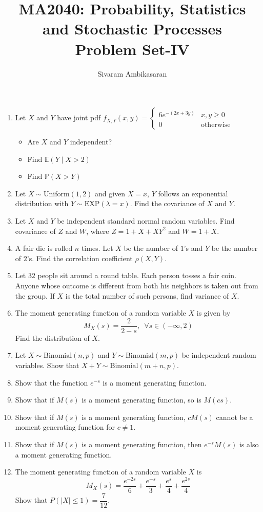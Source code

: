 \documentclass{article}
\title{MA2040: Probability, Statistics and Stochastic Processes\\
Problem Set-IV}
\author{Sivaram Ambikasaran}
\newcommand{\abs}[1]{\displaystyle\left\lvert#1\right\rvert}
\newcommand{\Pb}{\mathbb{P}}
\newcommand{\bkt}[1]{\left(#1\right)}
\begin{document}
	\maketitle
	\begin{enumerate}
		\item
		Let $X$ and $Y$ have joint pdf $f_{X,Y}(x,y) = \begin{cases}
		6 e^{-\bkt{2x+3y}} & x,y \geq 0\\
		0 & \text{otherwise}
		\end{cases}$
	\begin{itemize}
		\item
		Are $X$ and $Y$ independent?
		\item
		Find $\mathbb{E}\bkt{Y \mid X>2}$
		\item
		Find $\Pb\bkt{X > Y}$
	\end{itemize}
	\item
	Let $X \sim \text{Uniform}(1,2)$ and given $X=x$, $Y$ follows an exponential distribution with $Y \sim \text{EXP}\bkt{\lambda=x}$. Find the covariance of $X$ and $Y$.
	\item
	Let $X$ and $Y$ be independent standard normal random variables. Find covariance of $Z$ and $W$, where $Z = 1+X+XY^2$ and $W = 1+X$.
	\item
	A fair die is rolled $n$ times. Let $X$ be the number of $1$'s and $Y$ be the number of $2$'s. Find the correlation coefficient $\rho(X,Y)$.
	\item
	Let $32$ people sit around a round table. Each person tosses a fair coin. Anyone whose outcome is different from both his neighbors is taken out from the group. If $X$ is the total number of such persons, find variance of $X$.
	\item
	The moment generating function of a random variable $X$ is given by
	$$M_X(s) = \dfrac2{2-s}, \,\,\, \forall s \in (-\infty,2)$$
	Find the distribution of $X$.
	\item
	Let $X \sim \text{Binomial}(n,p)$ and $Y \sim \text{Binomial}(m,p)$ be independent random variables. Show that $X+Y \sim \text{Binomial}(m+n,p)$.
	\item
	Show that the function $e^{-s}$ is a moment generating function.
	\item
	Show that if $M(s)$ is a moment generating function, so is $M(cs)$.
	\item
	Show that if $M(s)$ is a moment generating function, $cM(s)$ cannot be a moment generating function for $c \neq 1$.
	\item
	Show that if $M(s)$ is a moment generating function, then $e^{-s}M(s)$ is also a moment generating function.
	\item
	The moment generating function of a random variable $X$ is
	$$M_X(s) = \dfrac{e^{-2s}}6 + \dfrac{e^{-s}}3 + \dfrac{e^{s}}4 + \dfrac{e^{2s}}4$$
	Show that $P\bkt{\abs{X} \leq 1} = \dfrac7{12}$.
	\end{enumerate}
\end{document}
